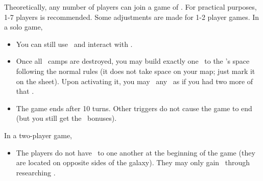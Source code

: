 Theoretically, any number of players can join a game of \asciiplanets.  For 
practical purposes, 1-7 players is recommended.  Some adjustments are made for 
1-2 player games.
\newline\newline
In a solo game,
\begin{itemize}
  \item You can still use \convoys\ and interact with \pirates.
  \item Once all \pirates\ camps are destroyed, you may build exactly one 
        \battleship\ to the \pirate's space following the normal rules (it does 
        not take space on your map; just mark it on the sheet).  Upon activating
        it, you may \activate\ any \armament\ as if you had two more of that 
        \armament.
  \item The game ends after 10 turns. Other triggers do not cause the game to 
        end (but you still get the \mastery\ bonuses).
\end{itemize}
In a two-player game,
\begin{itemize}
  \item The players do not have \reach\ to one another at the beginning of the 
        game (they are located on opposite sides of the galaxy). They may only 
        gain \reach\ through researching \warpdrive.
\end{itemize}
